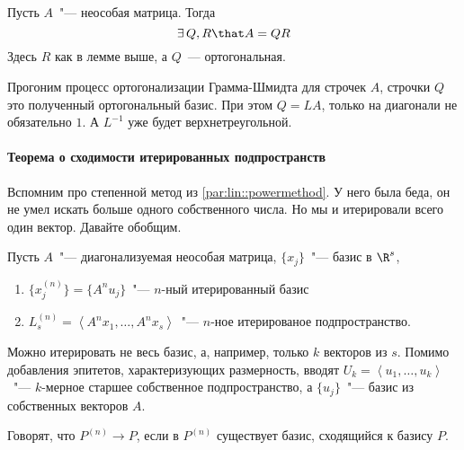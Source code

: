 \documentclass{trlnotes}
\begin{document}
\begin{lem}\label{lem:lin::factor::qr}
  Пусть $A$~"--- неособая матрица.
  Тогда
  \[
    \exists\, Q,R \that A = QR
  \]
  Здесь $R$ как в лемме выше, а $Q$~--- ортогональная.
\end{lem}
\begin{prf}
  Прогоним процесс ортогонализации Грамма-Шмидта для строчек $A$, 
  строчки $Q$ это полученный ортогональный базис. 
  При этом $Q = LA$, только на диагонали не обязательно $1$.
  А $L^{-1}$ уже будет верхнетреугольной.
\end{prf}

\paragraph{Теорема о сходимости итерированных подпространств}
\label{par:lin::iterspaceconv}

Вспомним про степенной метод из \ref{par:lin::powermethod}.
У него была беда, он не умел искать больше одного собственного числа.
Но мы и итерировали всего один вектор. Давайте обобщим.

\begin{defn}\label{defn:lin::iterspaceconv::iterbas}
  Пусть $A$~"--- диагонализуемая неособая матрица, 
  $\{x_{j}\}$~"---  базис в $\R^s$, 
  \begin{enumerate}
    \item $\bigl\{x_{j}^{(n)}\bigr\}=\bigl\{A^nu_j\bigr\}$~"--- 
      $n$-ный итерированный базис
    \item $L_s^{(n)} = \left\langle A^n x_1,\dotsc,A^n x_s\right\rangle$~"--- 
      $n$-ное итерированое подпространство.
  \end{enumerate}
\end{defn}
\begin{rem}
  Можно итерировать не весь базис, а, например, только $k$ векторов из $s$.
  Помимо добавления эпитетов, характеризующих размерность, 
  вводят $U_k=\left\langle u_1, \dotsc, u_k\right\rangle$~"---  $k$-мерное
  старшее собственное подпространство, а $\{u_j\}$~"--- базис из собственных
  векторов $A$.
\end{rem}

\begin{defn}\label{defn:lin::iterspaceconv::iterspconv}
  Говорят, что $P^{(n)} \to P$, если в $P^{(n)}$ существует базис, сходящийся к
  базису $P$.
\end{defn}
\end{document}
